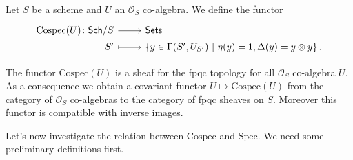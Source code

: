 \begin{defn}[]
	Let $S$ be a scheme and $U$ an $\mathcal{O}_{ S }$ co-algebra.
	We define the functor 
	\begin{equation*}
	\begin{tikzcd}[row sep = 0ex
		,/tikz/column 1/.append style={anchor=base east}
		,/tikz/column 2/.append style={anchor=base west}]
		\mathrm{Cospec}(U)\colon 
		\mathsf{Sch}/S\arrow[r, "", rightarrow] &
		\mathsf{Sets} \\
		S' \arrow[r, "", mapsto] & 
		\left\{ y \in \Gamma(S', U_{S'}) \ \middle|\ 
		\eta(y) = 1, \Delta(y) = y \otimes y\right\}
	.\end{tikzcd}
	\end{equation*} 
\end{defn}


\begin{rem}
	The functor $\mathrm{Cospec}(U)$ is a sheaf for the fpqc topology
	for all $\mathcal{O}_{ S }$ co-algebra $U$.
	As a consequence we obtain a covariant functor $U \mapsto \mathrm{Cospec}(U)$
	from the category of $\mathcal{O}_{ S }$ co-algebras to the category
	of fpqc sheaves on $S$.
	Moreover this functor is compatible with inverse images.
\end{rem}


\noindent
Let's now investigate the relation between $\mathrm{Cospec}$ and $\mathrm{Spec}$.
We need some preliminary definitions first.


